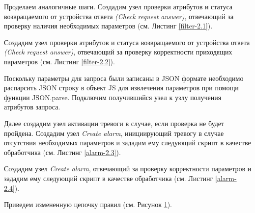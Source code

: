 \documentclass[a4paper,14pt]{extarticle}
\begin{document}
Проделаем аналогичные шаги. Создадим узел проверки атрибутов и статуса возвращаемого от устройства ответа \textit{(Check request answer)}, отвечающий за проверку наличия необходимых параметров (см. Листинг \ref{filter-2.1}).



Создадим узел проверки атрибутов и статуса возвращаемого от устройства ответа \textit{(Check request answer)}, отвечающий за проверку корректности приходящих параметров (см. Листинг \ref{filter-2.2}).





Поскольку параметры для запроса были записаны в JSON формате необходимо распарсить JSON строку в объект JS для извлечения параметров при помощи функции JSON.parse. 
Подключим получившийся узел к узлу получения атрибутов запроса.

Далее создадим узел активации тревоги в случае, если проверка не будет пройдена. Создадим узел \textit{Create alarm}, инициирующий тревогу в случае отсутствия необходимых параметров и зададим ему следующий скрипт в качестве обработчика (см. Листинг \ref{alarm-2.3}).



Создадим узел \textit{Create alarm}, отвечающий за проверку корректности параметров и зададим ему следующий скрипт в качестве обработчика (см. Листинг \ref{alarm-2.4}).




Приведем измененную цепочку правил (см. Рисунок \ref{fig:chain-lamp}).
\begin{figure}[h!]
	\begin{minipage}[h!]{\linewidth}
	\end{minipage}
	
	\begin{minipage}[h!]{\linewidth}
	\end{minipage}
	\label{fig:chain-lamp}
\end{figure}
\end{document}
